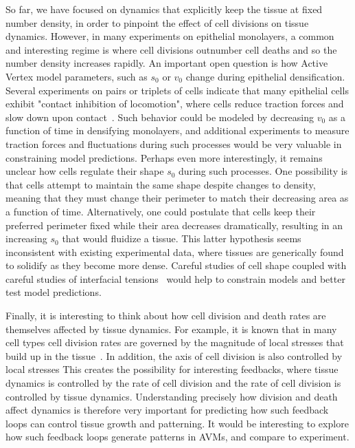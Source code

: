 \documentclass[
reprint
,aps
,amssymb
,amsmath
,superscriptaddress
]{revtex4-1}
\newcommand{\lisa}[1]{{\color{red}#1}}
\begin{document}
\lisa{So far, we have focused on dynamics that explicitly keep the tissue at fixed number density, in order to pinpoint the effect of cell divisions on tissue dynamics. However, in many experiments on epithelial monolayers, a common and interesting regime is where cell divisions outnumber cell deaths and so the number density increases rapidly. An important open question is how Active Vertex model parameters, such as $s_0$ or $v_0$ change during epithelial densification. Several experiments on pairs or triplets of cells indicate that many epithelial cells exhibit "contact inhibition of locomotion", where cells reduce traction forces and slow down upon contact~\cite{Puliafito2012, Abercrombie1970}. Such behavior could be modeled by decreasing $v_0$ as a function of time in densifying monolayers, and additional experiments to measure traction forces and fluctuations during such processes would be very valuable in constraining model predictions.  Perhaps even more interestingly, it remains unclear how cells regulate their shape $s_0$ during such processes.  One possibility is that cells attempt to maintain the same shape despite changes to density, meaning that they must change their perimeter to match their decreasing area as a function of time.  Alternatively, one could postulate that cells keep their preferred perimeter fixed while their area decreases dramatically, resulting in an increasing $s_0$ that would fluidize a tissue. This latter hypothesis seems inconsistent with existing experimental data, where tissues are generically found to solidify as they become more dense.  Careful studies of cell shape coupled with careful studies of interfacial tensions~\cite{Saraswathibhatla2019} would help to constrain models and better test model predictions. 

Finally, it is interesting to think about how cell division and death rates are themselves affected by tissue dynamics.  For example, it is known that in many cell types cell division rates are governed by the magnitude of local stresses that build up in the tissue~\cite{Shraiman2005, Streichan2014}. In addition, the axis of cell division is also controlled by local stresses This creates the possibility for interesting feedbacks, where tissue dynamics is controlled by the rate of cell division and the rate of cell division is controlled by tissue dynamics.  Understanding precisely how division and death affect dynamics is therefore very important for predicting how such feedback loops can control tissue growth and patterning. It would be interesting to explore how such feedback loops generate patterns in AVMs, and compare to experiment.}
\end{document}
